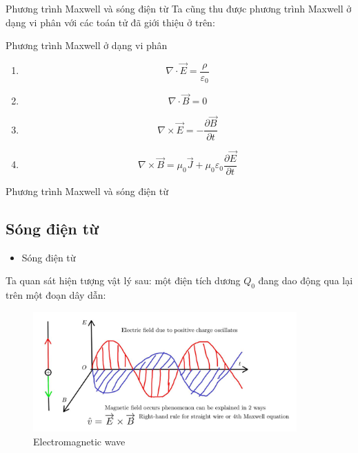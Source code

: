\documentclass[8pt]{beamer}
\begin{document}
\begin{frame}{Phương trình Maxwell và sóng điện từ}
Ta cũng thu được phương trình Maxwell ở dạng vi phân với các toán tử đã giới thiệu ở trên:
\begin{block}{Phương trình Maxwell ở dạng vi phân}
\begin{enumerate}
	\item $$\nabla\cdot\overrightarrow{E}=\frac{\rho}{\varepsilon_{0}}$$
	\item $$\nabla \cdot \overrightarrow{B}=0$$
	\item $$\nabla \times \overrightarrow{E}=-\frac{\partial \overrightarrow{B}}{\partial t}$$
	\item $$\nabla \times \overrightarrow{B}=\mu_{0}\overrightarrow{J}+\mu_{0}\varepsilon_{0}\frac{\partial \overrightarrow{E}}{\partial t}$$
\end{enumerate}
\end{block}
\end{frame}
\begin{frame}{Phương trình Maxwell và sóng điện từ}
\subsection{Sóng điện từ}
\begin{itemize}
\item Sóng điện từ
\end{itemize}
Ta quan sát hiện tượng vật lý sau: một điện tích dương $Q_{0}$ đang dao động qua lại trên một đoạn dây dẫn:

\begin{figure}[h]
	\includegraphics[width=0.9\textwidth]{wave.jpg}
			\caption{Electromagnetic wave}\label{fig:re10}
		\end{figure}
\end{frame}
\end{document}
